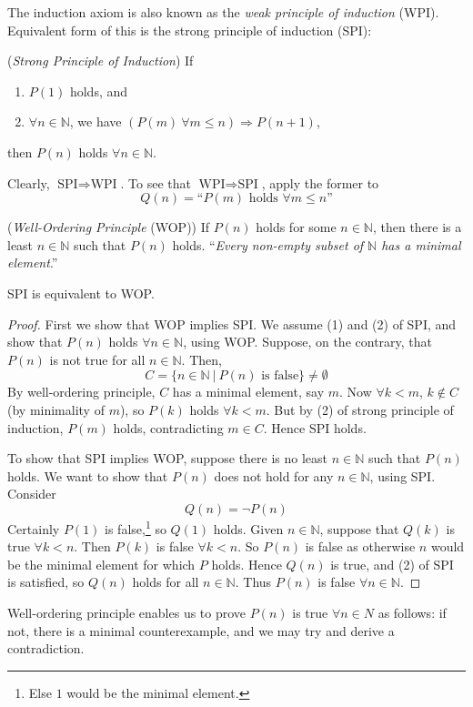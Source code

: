 \documentclass[10pt, a4paper, twoside]{report}
\begin{document}
The induction axiom is also known as the \emph{weak principle of induction} (WPI). Equivalent form of this is the strong principle of induction (SPI):
\begin{theorem}
    (\emph{Strong Principle of Induction}) If
    \begin{enumerate}
        \item \(P(1)\) holds, and
        \item \(\forall n\in\mathbb{N}\), we have \((P(m)\:\forall m\leq n)\Rightarrow P(n+1)\), 
    \end{enumerate}
    then \(P(n)\) holds \(\forall n\in\mathbb{N}\).
\end{theorem}
Clearly, \(\text{SPI}\Rightarrow\text{WPI}\). To see that \(\text{WPI}\Rightarrow\text{SPI}\), apply the former to
\[Q(n)=\text{``\(P(m)\) holds \(\forall m\leq n\)''}\]
\begin{theorem}
    (\emph{Well-Ordering Principle} (WOP)) If \(P(n)\) holds for some \(n\in\mathbb{N}\), then there is a least \(n\in\mathbb{N}\) such that \(P(n)\) holds. ``\emph{Every non-empty subset of \(\mathbb{N}\) has a minimal element}.''
    \label{thm:wop}
\end{theorem}
\begin{theorem}
    SPI is equivalent to WOP.
\end{theorem}
\begin{proof}
    First we show that WOP implies SPI. We assume (1) and (2) of SPI, and show that \(P(n)\) holds \(\forall n\in\mathbb{N}\), using WOP. Suppose, on the contrary, that \(P(n)\) is not true for all \(n\in\mathbb{N}\). Then,
    \[C=\{n\in\mathbb{N}\:|\:P(n)\text{ is false}\}\neq\emptyset\]
    By well-ordering principle, \(C\) has a minimal element, say \(m\). Now \(\forall k<m\), \(k\notin C\) (by minimality of \(m\)), so \(P(k)\) holds \(\forall k<m\). But by (2) of strong principle of induction, \(P(m)\) holds, contradicting \(m\in C\). Hence SPI holds.

    To show that SPI implies WOP, suppose there is no least \(n\in\mathbb{N}\) such that \(P(n)\) holds. We want to show that \(P(n)\) does not hold for any \(n\in\mathbb{N}\), using SPI. Consider
    \[Q(n)=\neg P(n)\]
    Certainly \(P(1)\) is false,\footnote{Else \(1\) would be the minimal element.} so \(Q(1)\) holds. Given \(n\in\mathbb{N}\), suppose that \(Q(k)\) is true \(\forall k<n\). Then \(P(k)\) is false \(\forall k<n\). So \(P(n)\) is false as otherwise \(n\) would be the minimal element for which \(P\) holds. Hence \(Q(n)\) is true, and (2) of SPI is satisfied, so \(Q(n)\) holds for all \(n\in\mathbb{N}\). Thus \(P(n)\) is false \(\forall n\in\mathbb{N}\).
\end{proof}
Well-ordering principle enables us to prove \(P(n)\) is true \(\forall n\in N\) as follows: if not, there is a minimal counterexample, and we may try and derive a contradiction.
\end{document}
